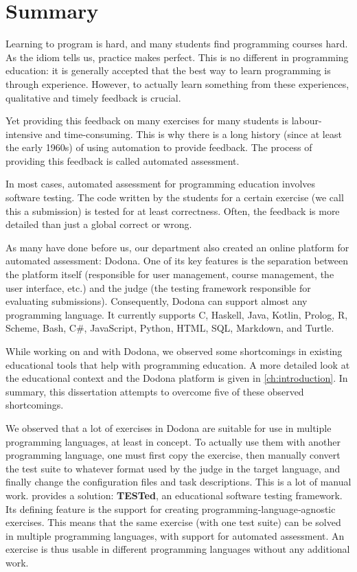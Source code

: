 \documentclass[main]{subfiles}
\begin{document}
\chapter*{Summary}\label{ch:summary}

Learning to program is hard, and many students find programming courses hard.
As the idiom tells us, practice makes perfect.
This is no different in programming education: it is generally accepted that the best way to learn programming is through experience.
However, to actually learn something from these experiences, qualitative and timely feedback is crucial.

Yet providing this feedback on many exercises for many students is labour-intensive and time-consuming.
This is why there is a long history (since at least the early 1960s) of using automation to provide feedback.
The process of providing this feedback is called automated assessment.

In most cases, automated assessment for programming education involves software testing.
The code written by the students for a certain exercise (we call this a submission) is tested for at least correctness.
Often, the feedback is more detailed than just a global correct or wrong.

As many have done before us, our department also created an online platform for automated assessment: Dodona.
One of its key features is the separation between the platform itself (responsible for user management, course management, the user interface, etc.) and the judge (the testing framework responsible for evaluating submissions).
Consequently, Dodona can support almost any programming language.
It currently supports C, Haskell, Java, Kotlin, Prolog, R, Scheme, Bash, C\#, JavaScript, Python, HTML, SQL, Markdown, and Turtle.

While working on and with Dodona, we observed some shortcomings in existing educational tools that help with programming education.
A more detailed look at the educational context and the Dodona platform is given in \cref{ch:introduction}.
In summary, this dissertation attempts to overcome five of these observed shortcomings.

We observed that a lot of exercises in Dodona are suitable for use in multiple programming languages, at least in concept.
To actually use them with another programming language, one must first copy the exercise, then manually convert the test suite to whatever format used by the judge in the target language, and finally change the configuration files and task descriptions.
This is a lot of manual work.
 provides a solution: \textbf{TESTed}, an educational software testing framework.
Its defining feature is the support for creating programming‐language‐agnostic exercises.
This means that the same exercise (with one test suite) can be solved in multiple programming languages, with support for automated assessment.
An exercise is thus usable in different programming languages without any additional work.
\end{document}
